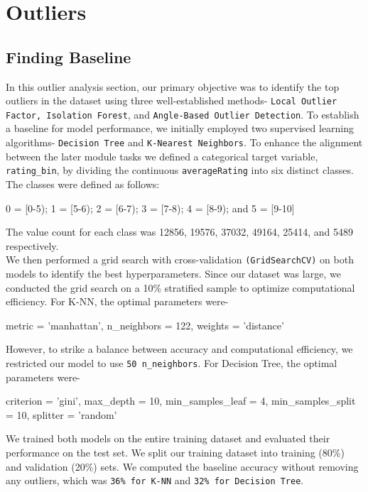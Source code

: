 \section{Outliers}
\subsection{Finding Baseline}
In this outlier analysis section, our primary objective was to identify the top outliers in the dataset using three well-established methods- 
\texttt{Local Outlier Factor, Isolation Forest}, and \texttt{Angle-Based Outlier Detection}. 
To establish a baseline for model performance, we initially employed two supervised learning algorithms- 
\texttt{Decision Tree} and \texttt{K-Nearest Neighbors}.
To enhance the alignment between the later module tasks we defined a categorical target variable, \texttt{rating\_bin}, 
by dividing the continuous \texttt{averageRating} into six distinct classes. 
The classes were defined as follows:
\begin{center}
    0 = [0-5); 1 = [5-6); 2 = [6-7); 3 = [7-8); 4 = [8-9); and 5 = [9-10]\\
\end{center}
The value count for each class was 12856, 19576, 37032, 49164, 25414, and 5489 respectively.\\
We then performed a grid search with cross-validation \texttt{(GridSearchCV)} on both models to identify the best hyperparameters. 
Since our dataset was large, we conducted the grid search on a 10\% stratified sample to optimize computational efficiency. 
For K-NN, the optimal parameters were- 
\begin{center}
    metric = 'manhattan', n\_neighbors = 122, weights = 'distance'
\end{center} 
However, to strike a balance between accuracy and computational efficiency, we restricted our model to use \texttt{50 n\_neighbors}. 
For Decision Tree, the optimal parameters were-
\begin{center}
    criterion = 'gini', max\_depth = 10, min\_samples\_leaf = 4, min\_samples\_split = 10, splitter = 'random'
\end{center}
We trained both models on the entire training dataset and evaluated their performance on the test set. 
We split our training dataset into training (80\%) and validation (20\%) sets. We computed the baseline accuracy 
without removing any outliers, which was \texttt{36\% for K-NN} and \texttt{32\% for Decision Tree}.

